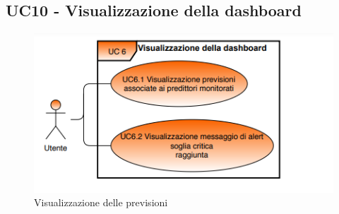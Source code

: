 
	\label{par:UC10}
	\subsection{UC10 - Visualizzazione della dashboard}

	\begin{figure}[H]
		\centering
		\includegraphics[scale=0.80]{../Analisi_dei_requisiti/img/Diagrammi_UML/UC9_Visualizzazione_della_dashboard.png}
		\caption{Visualizzazione delle previsioni}
	\end{figure}

